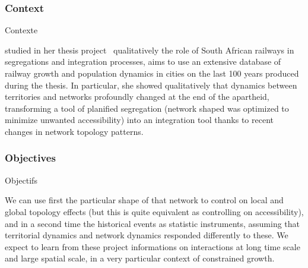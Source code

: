 




\subsubsection{Context}{Contexte}


 studied in her thesis project~\cite{baffi:tel-01389347} qualitatively the role of South African railways in segregations and integration processes, aims to use an extensive database of railway growth and population dynamics in cities on the last 100 years produced during the thesis. In particular, she showed qualitatively that dynamics between territories and networks profoundly changed at the end of the apartheid, transforming a tool of planified segregation (network shaped was optimized to minimize unwanted accessibility) into an integration tool thanks to recent changes in network topology patterns.

\subsubsection{Objectives}{Objectifs}

We can use first the particular shape of that network to control on local and global topology effects (but this is quite equivalent as controlling on accessibility), and in a second time the historical events as statistic instruments, assuming that territorial dynamics and network dynamics responded differently to these. We expect to learn from these project informations on interactions at long time scale and large spatial scale, in a very particular context of constrained growth. 






